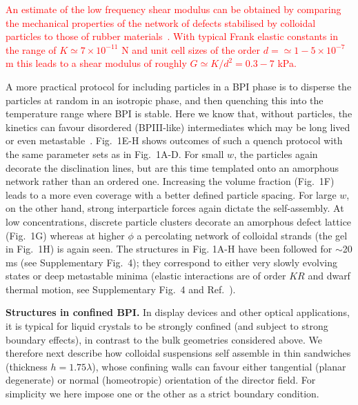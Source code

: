 \documentclass[12pt]{article}
\begin{document}
\textcolor{red}{An estimate of the low frequency shear modulus can be 
obtained by comparing the mechanical properties of the network of defects 
stabilised by colloidal particles to those of rubber materials~\cite{ramos}.
With typical Frank elastic constants in the range of $K\simeq7\times10^{-11}$ N
and unit cell sizes of the order $d=\simeq 1-5\times10^{-7}$ m this leads to
a shear modulus of roughly $G\simeq K/d^2=0.3-7$ kPa.}  

A more practical protocol for including particles in a BPI phase is to disperse the particles at random in an isotropic phase, and then quenching this into the temperature range where BPI is stable. Here we know that, without particles, the kinetics can favour disordered (BPIII-like) intermediates which may be long lived or even metastable~\cite{domaingrowth}. Fig.~1E-H shows outcomes of such a quench protocol with the same parameter sets as in Fig.~1A-D. For small $w$, the particles again decorate the disclination lines, but are this time templated onto an amorphous network rather than an ordered one.
Increasing the volume fraction (Fig.~1F) leads to a more even coverage with
a better defined particle spacing. 
For large $w$, on the other hand, strong interparticle forces again dictate
the self-assembly. At low concentrations, discrete particle clusters decorate an amorphous defect lattice (Fig.~1G) whereas at higher $\phi$ a percolating network of colloidal strands (the gel in Fig.~1H) is again seen. 
The structures in Fig. 1A-H have been followed for $\sim$20 ms 
(see Supplementary Fig.~4); they correspond to either very slowly evolving
states or  deep metastable minima (elastic interactions are of
order $KR$ and dwarf thermal motion, see
Supplementary Fig.~4 and Ref.~\cite{stark,lavrentovich}).

\medskip
\noindent
\textbf{Structures in confined BPI.}
In display devices and other optical applications, it is typical for liquid crystals to be strongly confined (and subject to strong boundary effects), in contrast to the bulk geometries considered above. We therefore next describe how colloidal suspensions self assemble in thin sandwiches (thickness $h = 1.75 \lambda$), whose confining walls can favour either tangential (planar degenerate) or normal (homeotropic) orientation of the director field. For simplicity we here impose one or the other as a strict boundary condition.
\end{document}
